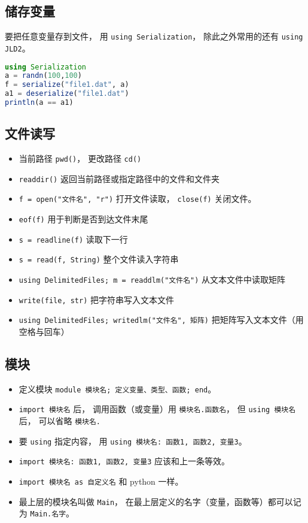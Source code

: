 \subsection{储存变量}
要把任意变量存到文件， 用 \verb`using Serialization`， 除此之外常用的还有 \verb`using JLD2`。
\begin{lstlisting}[language=julia]
using Serialization
a = randn(100,100)
f = serialize("file1.dat", a)
a1 = deserialize("file1.dat")
println(a == a1)
\end{lstlisting}

\subsection{文件读写}
\begin{itemize}
\item 当前路径 \verb`pwd()`， 更改路径 \verb`cd()`
\item \verb`readdir()` 返回当前路径或指定路径中的文件和文件夹
\item \verb`f = open("文件名", "r")` 打开文件读取， \verb`close(f)` 关闭文件。
\item \verb`eof(f)` 用于判断是否到达文件末尾
\item \verb`s = readline(f)` 读取下一行
\item \verb`s = read(f, String)` 整个文件读入字符串
\item \verb`using DelimitedFiles; m = readdlm("文件名")` 从文本文件中读取矩阵
\item \verb`write(file, str)` 把字符串写入文本文件
\item \verb`using DelimitedFiles; writedlm("文件名", 矩阵)` 把矩阵写入文本文件（用空格与回车）
\end{itemize}

\subsection{模块}
\begin{itemize}
\item 定义模块 \verb`module 模块名; 定义变量、类型、函数; end`。
\item \verb`import 模块名` 后， 调用函数（或变量）用 \verb`模块名.函数名`， 但 \verb`using 模块名` 后， 可以省略 \verb`模块名.`
\item 要 \verb`using` 指定内容， 用 \verb`using 模块名: 函数1, 函数2, 变量3`。
\item \verb`import 模块名: 函数1, 函数2, 变量3` 应该和上一条等效。
\item \verb`import 模块名 as 自定义名` 和 python 一样。
\item 最上层的模块名叫做 \verb`Main`， 在最上层定义的名字（变量，函数等）都可以记为 \verb`Main.名字`。
\end{itemize}

